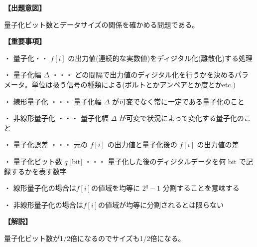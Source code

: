 \noindent \textbf{【出題意図】}

\noindent 量子化ビット数とデータサイズの関係を確かめる問題である。

\vspace{1em}
\noindent \textbf{【重要事項】}

\medskip
\noindent ・ 量子化・・ $f[i]$ の出力値(連続的な実数値)をディジタル化(離散化)する処理

\medskip
\noindent ・ 量子化幅 $\Delta$ ・・・ どの間隔で出力値のディジタル化を行うかを決めるパラメータ。単位は扱う信号の種類による(ボルトとかアンペアとか度とかetc.)

\medskip
\noindent ・ 線形量子化 ・・・ 量子化幅  $\Delta$ が可変でなく常に一定である量子化のこと

\medskip
\noindent ・ 非線形量子化 ・・・ 量子化幅  $\Delta$ が可変で状況によって変化する量子化のこと

\medskip
\noindent ・ 量子化誤差 ・・・ 元の $f[i]$ の出力値と量子化後の $f[i]$ の出力値の差

\medskip
\noindent ・ 量子化ビット数 $q$ [bit] ・・・ 量子化した後のディジタルデータを何 bit で記録するかを表す数字

\medskip
\noindent ・ 線形量子化の場合は$f[i]$の値域を均等に $2^q-1$ 分割することを意味する

\medskip
\noindent ・ 非線形量子化の場合は$f[i]$の値域が均等に分割されるとは限らない

\vspace{1em}
\noindent \textbf{【解説】}

\noindent 量子化ビット数が1/2倍になるのでサイズも1/2倍になる。

